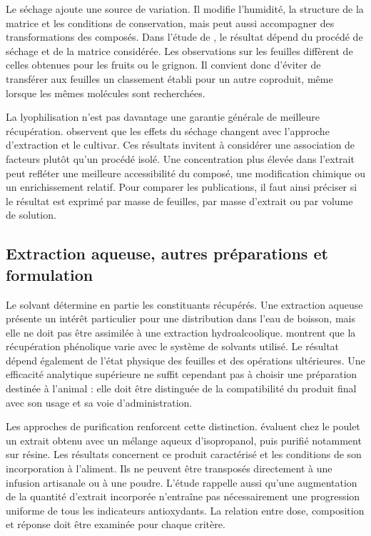 Le séchage ajoute une source de variation. Il modifie l'humidité, la structure de la matrice et les conditions de conservation, mais peut aussi accompagner des transformations des composés. Dans l'étude de \citet{CastilloLuna2023}, le résultat dépend du procédé de séchage et de la matrice considérée. Les observations sur les feuilles diffèrent de celles obtenues pour les fruits ou le grignon. Il convient donc d'éviter de transférer aux feuilles un classement établi pour un autre coproduit, même lorsque les mêmes molécules sont recherchées.

La lyophilisation n'est pas davantage une garantie générale de meilleure récupération. \citet{CorAndrejc2022} observent que les effets du séchage changent avec l'approche d'extraction et le cultivar. Ces résultats invitent à considérer une association de facteurs plutôt qu'un procédé isolé. Une concentration plus élevée dans l'extrait peut refléter une meilleure accessibilité du composé, une modification chimique ou un enrichissement relatif. Pour comparer les publications, il faut ainsi préciser si le résultat est exprimé par masse de feuilles, par masse d'extrait ou par volume de solution.

\subsection{Extraction aqueuse, autres préparations et formulation}

Le solvant détermine en partie les constituants récupérés. Une extraction aqueuse présente un intérêt particulier pour une distribution dans l'eau de boisson, mais elle ne doit pas être assimilée à une extraction hydroalcoolique. \citet{Papageorgiou2022} montrent que la récupération phénolique varie avec le système de solvants utilisé. Le résultat dépend également de l'état physique des feuilles et des opérations ultérieures. Une efficacité analytique supérieure ne suffit cependant pas à choisir une préparation destinée à l'animal : elle doit être distinguée de la compatibilité du produit final avec son usage et sa voie d'administration.

Les approches de purification renforcent cette distinction. \citet{Vasilopoulou2023} évaluent chez le poulet un extrait obtenu avec un mélange aqueux d'isopropanol, puis purifié notamment sur résine. Les résultats concernent ce produit caractérisé et les conditions de son incorporation à l'aliment. Ils ne peuvent être transposés directement à une infusion artisanale ou à une poudre. L'étude rappelle aussi qu'une augmentation de la quantité d'extrait incorporée n'entraîne pas nécessairement une progression uniforme de tous les indicateurs antioxydants. La relation entre dose, composition et réponse doit être examinée pour chaque critère.

